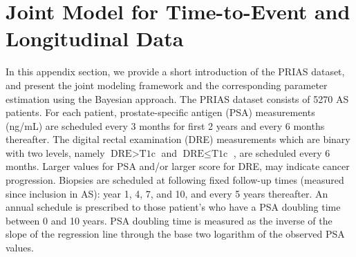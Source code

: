 \section{Joint Model for Time-to-Event and Longitudinal Data}
\label{sec:jm_framework}
In this appendix section, we provide a short introduction of the PRIAS dataset, and present the joint modeling framework and the corresponding parameter estimation using the Bayesian approach. The PRIAS dataset consists of 5270 AS patients. For each patient, prostate-specific antigen (PSA) measurements (ng/mL) are scheduled every 3 months for first 2 years and every 6 months thereafter. The digital rectal examination (DRE) measurements which are binary with two levels, namely $\mbox{DRE} > \mbox{T1c}$ and $\mbox{DRE} \leq \mbox{T1c}$ \citep{schroder1992tnm}, are scheduled every 6 months. Larger values for PSA and/or larger score for DRE, may indicate cancer progression. Biopsies are scheduled at following fixed follow-up times (measured since inclusion in AS): year 1, 4, 7, and 10, and every 5 years thereafter. An annual schedule is prescribed to those patient's who have a PSA doubling time between 0 and 10 years. PSA doubling time is measured as the inverse of the slope of the regression line through the base two logarithm of the observed PSA values.

